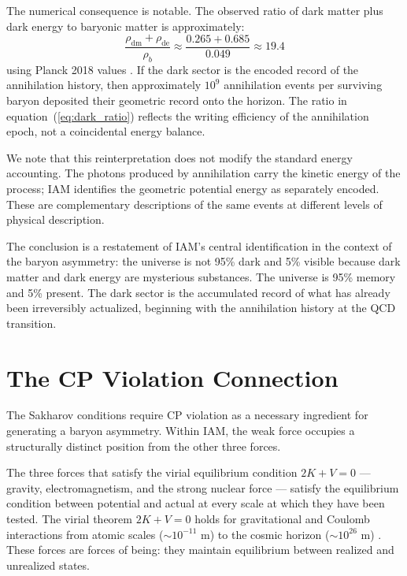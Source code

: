 \documentclass[12pt,a4paper]{article}
\begin{document}
The numerical consequence is notable. The observed ratio of dark matter
plus dark energy to baryonic matter is approximately:
\begin{equation}
\frac{\rho_\mathrm{dm} + \rho_\mathrm{de}}{\rho_b} \approx
\frac{0.265 + 0.685}{0.049} \approx 19.4
\label{eq:dark_ratio}
\end{equation}
using Planck 2018 values \citep{planck2020}. If the dark sector is the
encoded record of the annihilation history, then approximately $10^9$
annihilation events per surviving baryon deposited their geometric
record onto the horizon. The ratio in equation~(\ref{eq:dark_ratio})
reflects the writing efficiency of the annihilation epoch, not a
coincidental energy balance.

We note that this reinterpretation does not modify the standard energy
accounting. The photons produced by annihilation carry the kinetic
energy of the process; IAM identifies the geometric potential energy as
separately encoded. These are complementary descriptions of the same
events at different levels of physical description.

The conclusion is a restatement of IAM's central identification in the
context of the baryon asymmetry: the universe is not 95\% dark and 5\%
visible because dark matter and dark energy are mysterious substances.
The universe is 95\% memory and 5\% present. The dark sector is the
accumulated record of what has already been irreversibly actualized,
beginning with the annihilation history at the QCD transition.

\section{The CP Violation Connection}
\label{sec:cpviolation}

The Sakharov conditions require CP violation as a necessary ingredient
for generating a baryon asymmetry. Within IAM, the weak force occupies
a structurally distinct position from the other three forces.

The three forces that satisfy the virial equilibrium condition $2K + V = 0$
\citep{mahaffey2026_thermo_virial} — gravity, electromagnetism, and the
strong nuclear force — satisfy the equilibrium condition between
potential and actual at every scale at which they have been tested. The
virial theorem $2K + V = 0$ holds for gravitational and Coulomb
interactions from atomic scales ($\sim 10^{-11}$ m) to the cosmic
horizon ($\sim 10^{26}$ m) \citep{mahaffey2026_virial}. These forces
are forces of being: they maintain equilibrium between realized and
unrealized states.
\end{document}
